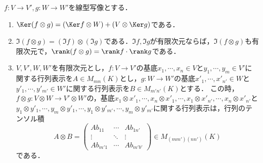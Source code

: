 \documentclass[uplatex, dvipdfmx]{jsreport}
\begin{document}
\begin{proposition}[行列のテンソル積]\label{prop-tensor-product-of-matrices}
    $f:V\to V',g:W\to W'$を線型写像とする．
    \begin{enumerate}
        \item $\Ker(f\otimes g)=(\Ker f\otimes W)+(V\otimes\Ker g)$である．
        \item $\Im(f\otimes g)=(\Im f)\otimes(\Im g)$である．$\Im f,\Im g$が有限次元ならば，$\Im(f\otimes g)$も有限次元で，$\rank(f\otimes g)=\rank f\cdot\rank g$である．
        \item $V,V',W,W'$を有限次元とし，$f:V\to V'$の基底$x_1,\cdots,x_n\in V$と$y_1,\cdots,y_m\in V'$に関する行列表示を$A\in M_{mn}(K)$とし，$g:W\to W'$の基底$x'_1,\cdots,x'_{n'}\in W$と$y'_1,\cdots,y'_{m'}\in W'$に関する行列表示を$B\in M_{m'n'}(K)$とする．
        この時，$f\otimes g:V\otimes W\to V'\otimes W'$の，基底$x_1\otimes x'_1,\cdots,x_n\otimes x'_1,\cdots,x_1\otimes x'_{n'},\cdots,x_n\otimes x'_{n'}$と$y_1\otimes y'_1,\cdots,y_m\otimes y'_1,\cdots,y_1\otimes y'_{m'},\cdots,y_m\otimes y'_{m'}$に関する行列表示は，行列のテンソル積
        \[A\otimes B=\begin{pmatrix}Ab_{11}&\cdots&Ab_{1n'}\\\vdots&\ddots&\vdots\\Ab_{m'1}&\cdots&Ab_{m'b'}\end{pmatrix}\in M_{(mm')(nn')}(K)\]
        である．
    \end{enumerate}
\end{proposition}
\end{document}
